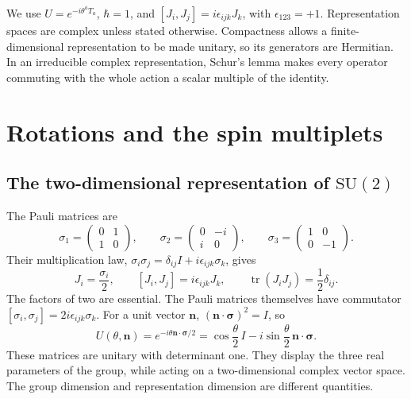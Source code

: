 \documentclass[11pt]{article}
\newcommand{\SU}{\mathrm{SU}}
\newcommand{\tr}{\operatorname{tr}}
\begin{document}
\begin{keyidea}
We use \(U=e^{-i\theta^aT_a}\), \(\hbar=1\), and
\([J_i,J_j]=i\epsilon_{ijk}J_k\), with \(\epsilon_{123}=+1\).
Representation spaces are complex unless stated otherwise. Compactness
allows a finite-dimensional representation to be made unitary, so its
generators are Hermitian. In an irreducible complex representation,
Schur's lemma makes every operator commuting with the whole action a
scalar multiple of the identity.
\end{keyidea}

\section{Rotations and the spin multiplets}
\label{sec:spin}
\subsection{The two-dimensional representation of \texorpdfstring{\(\SU(2)\)}{SU(2)}}
The Pauli matrices are
\[
 \sigma_1=\begin{pmatrix}0&1\\1&0\end{pmatrix},\qquad
 \sigma_2=\begin{pmatrix}0&-i\\i&0\end{pmatrix},\qquad
 \sigma_3=\begin{pmatrix}1&0\\0&-1\end{pmatrix}.
\]
Their multiplication law,
\(\sigma_i\sigma_j=\delta_{ij}I+i\epsilon_{ijk}\sigma_k\), gives
\begin{equation}
 J_i=\frac{\sigma_i}{2},\qquad
 [J_i,J_j]=i\epsilon_{ijk}J_k,\qquad
 \tr(J_iJ_j)=\frac12\delta_{ij}.
 \label{eq:pauli-generators}
\end{equation}
The factors of two are essential. The Pauli matrices themselves have
commutator \([\sigma_i,\sigma_j]=2i\epsilon_{ijk}\sigma_k\).
For a unit vector \(\bm n\), \((\bm n\cdot\bm\sigma)^2=I\), so
\begin{equation}
 U(\theta,\bm n)
 =e^{-i\theta\bm n\cdot\bm\sigma/2}
 =\cos\frac\theta2\,I-i\sin\frac\theta2\,\bm n\cdot\bm\sigma.
 \label{eq:su2-exponential}
\end{equation}
These matrices are unitary with determinant one. They display the
three real parameters of the group, while acting on a two-dimensional
complex vector space. The group dimension and representation dimension
are different quantities.
\end{document}
